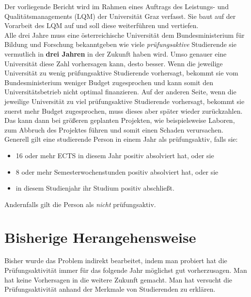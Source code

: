 

Der vorliegende Bericht wird im Rahmen eines Auftrags des Leistungs- und Qualit\"atsmanagements (LQM) der
Universität Graz verfasst. Sie baut auf der Vorarbeit des LQM auf und soll diese weiterf\"uhren 
und vertiefen. \\

Alle drei Jahre muss eine \"osterreichische Universität dem Bundesministerium f\"ur Bildung und Forschung
bekanntgeben wie viele \textit{pr\"ufungsaktive} Studierende sie vermutlich in \textbf{drei Jahren} 
in der Zukunft haben wird. Umso genauer eine Universität diese Zahl vorhersagen kann, desto besser.
Wenn die jeweilige Universität zu wenig pr\"ufungsaktive Studierende vorhersagt, bekommt sie vom Bundesministerium
weniger Budget zugesprochen und kann somit den Universitätsbetrieb nicht optimal finanzieren. Auf der anderen Seite,
wenn die jeweilige Universität zu viel pr\"ufungsaktive Studierende vorhersagt, bekommt sie zuerst mehr Budget zugesprochen,
muss dieses aber sp\"ater wieder zur\"uckzahlen. Das kann dann bei gr\"o{\ss}eren geplanten Projekten, wie beispielsweise Laboren,
zum Abbruch des Projektes f\"uhren und somit einen Schaden verursachen. \\

\noindent Generell gilt eine studierende Person in einem Jahr als pr\"ufungsaktiv, falls sie:

\begin{itemize}
    \item 16 oder mehr ECTS in diesem Jahr positiv absolviert hat, oder sie
    \item 8 oder mehr Semesterwochenstunden positiv absolviert hat, oder sie
    \item in diesem Studienjahr ihr Studium positiv abschlie{\ss}t.
\end{itemize}
Andernfalls gilt die Person als \textit{nicht} pr\"ufungsaktiv. \\





\section{Bisherige Herangehensweise}
Bisher wurde das Problem indirekt bearbeitet, indem man probiert hat die Pr\"ufungsaktivit\"at
immer f\"ur das folgende Jahr m\"oglichst gut vorherzusagen. Man hat keine Vorhersagen in die weitere Zukunft gemacht.
Man hat versucht die Pr\"ufungsaktivit\"at anhand der Merkmale von Studierenden zu erkl\"aren. \\

